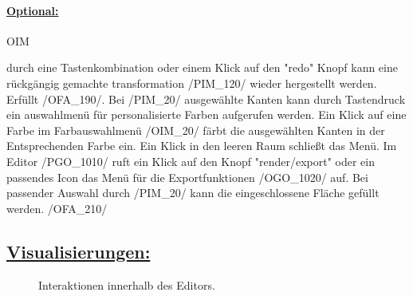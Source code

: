 %


\paragraph*{\underline{Optional:}}

\begin{ids}{\gls{OIM}}

	\id[10] durch eine Tastenkombination oder einem Klick auf den "redo" Knopf kann eine rückgängig gemachte transformation /PIM\_120/ wieder hergestellt werden. Erfüllt /OFA\_190/.
	\id[20] Bei /PIM\_20/ ausgewählte Kanten kann durch Tastendruck ein auswahlmenü für personalisierte Farben aufgerufen werden.
	\id[30] Ein Klick auf eine Farbe im Farbauswahlmenü /OIM\_20/ färbt die ausgewählten Kanten in der Entsprechenden Farbe ein. Ein Klick in den leeren Raum schließt das Menü.
	\id[40] Im Editor /PGO\_1010/ ruft ein Klick auf den Knopf "render/export" oder ein passendes Icon das Menü für die Exportfunktionen /OGO\_1020/ auf.
	\id[50] Bei passender Auswahl durch /PIM\_20/ kann die eingeschlossene Fläche gefüllt werden. /OFA\_210/ 

\end{ids}

\clearpage

\subsection*{\underline{Visualisierungen:}}

	\begin{figure}[h]
		\centering
	 	
	 	\caption{Interaktionen innerhalb des Editors.}
		\label{fig:inGame}
	\end{figure}
